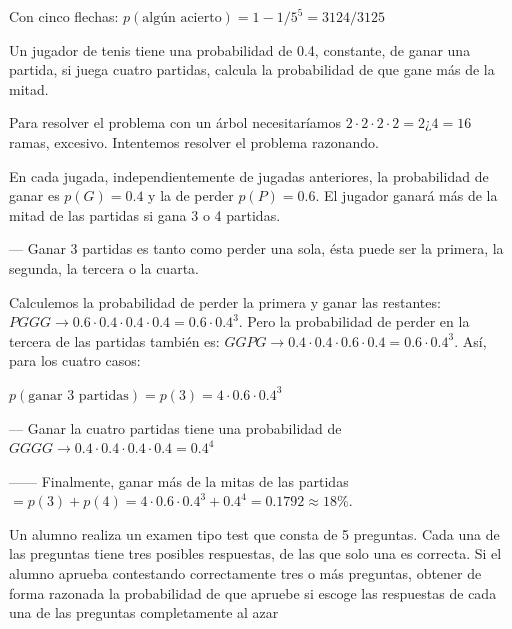 Con cinco flechas: $p(\text{algún acierto})=1-1/5^5=3124/3125$

\vspace{5mm}
\begin{ejemplo}
\begin{ejer}
Un jugador de tenis tiene una probabilidad de 0.4, constante, de ganar una partida, si juega cuatro partidas, calcula la probabilidad de que gane más de la mitad.	
\end{ejer}
\end{ejemplo}

Para resolver el problema con un árbol necesitaríamos $2 \cdot 2 \cdot 2 \cdot 2=2¿4=16$ ramas, excesivo. Intentemos resolver el problema razonando.

En cada jugada, independientemente de jugadas anteriores, la probabilidad de ganar es $p(G)=0.4$ y la de perder $p(P)=0.6$. El jugador ganará más de la mitad de las partidas si gana 3 o 4 partidas.

--- Ganar 3 partidas es tanto como perder una sola, ésta puede ser la primera, la segunda, la tercera o la cuarta.

Calculemos la probabilidad de perder la primera y ganar las restantes: $PGGG\to 0.6\cdot 0.4 \cdot 0.4 \cdot 0.4=0.6\cdot 0.4^3$. Pero la probabilidad de perder en la tercera de las partidas también es: $GGPG\to 0.4\cdot 0.4 \cdot 0.6 \cdot 0.4=0.6\cdot 0.4^3$. Así, para los cuatro casos:

$p(\text{ganar 3 partidas})=p(3)=4\cdot 0.6\cdot 0.4^3$

--- Ganar la cuatro partidas tiene una probabilidad de $GGGG\to 0.4\cdot 0.4 \cdot 0.4 \cdot 0.4=0.4^4$

------ Finalmente, ganar más de la mitas de las partidas $=p(3)+p(4)=4\cdot 0.6\cdot 0.4^3 +0.4^4=0.1792\approx 18\%$.



\vspace{5mm}
\begin{ejemplo}
\begin{ejer}
Un alumno realiza un examen tipo test que consta de 5 preguntas. Cada una de las preguntas tiene tres posibles respuestas, de las que solo una es correcta. Si el alumno aprueba contestando correctamente tres o más preguntas, obtener de forma razonada la probabilidad de que apruebe si escoge las respuestas de cada una de las preguntas completamente al azar	
\end{ejer}
\end{ejemplo}

